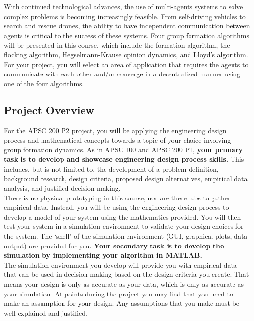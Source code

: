 \documentclass[../CourseManual.tex]{subfiles}
\begin{document}
With continued technological advances, the use of multi-agents systems to solve complex problems is  becoming increasingly feasible. From self-driving vehicles to search and rescue drones, the ability to have independent communication between agents is critical to the success of these systems. Four group formation algorithms will be presented in this course, which include the formation algorithm, the flocking algorithm, Hegselmann-Krause opinion dynamics, and Lloyd's algorithm. For your project, you will select an area of application that requires the agents to communicate with each other and/or converge in a decentralized manner using one of the four algorithms.

\subsection{Project Overview}
For the APSC 200 P2 project, you will be applying the engineering design process and mathematical concepts towards a topic of your choice involving group formation dynamics. As in APSC 100 and APSC 200 P1, \textbf{your primary task is to develop and showcase engineering design process skills.} This includes, but is not limited to, the development of a problem definition, background research, design criteria, proposed design alternatives, empirical data analysis, and justified decision making. \\

There is no physical prototyping in this course, nor are there labs to gather empirical data. Instead, you will be using the engineering design process to develop a model of your system using the mathematics provided. You will then test your system in a simulation environment to validate your design choices for the system. The `shell' of the simulation environment (GUI, graphical plots, data output) are provided for you. \textbf{Your secondary task is to develop the simulation by implementing your algorithm in MATLAB.} \\

The simulation environment you develop will provide you with empirical data that can be used in decision making based on the design criteria you create. That means your design is only as accurate as your data, which is only as accurate as your simulation. At points during the project you may find that you need to make an assumption for your design. Any assumptions that you make must be well explained and justified. \\

\\
\end{document}
